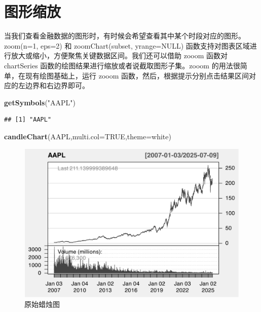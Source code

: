 \documentclass[]{ctexbook}
\newenvironment{Shaded}{\begin{snugshade}}{\end{snugshade}}
\newcommand{\AttributeTok}[1]{\textcolor[rgb]{0.13,0.29,0.53}{#1}}
\newcommand{\ConstantTok}[1]{\textcolor[rgb]{0.56,0.35,0.01}{#1}}
\newcommand{\FunctionTok}[1]{\textcolor[rgb]{0.13,0.29,0.53}{\textbf{#1}}}
\newcommand{\NormalTok}[1]{#1}
\newcommand{\StringTok}[1]{\textcolor[rgb]{0.31,0.60,0.02}{#1}}
\begin{document}
\section{图形缩放}\label{ux56feux5f62ux7f29ux653e}

当我们查看金融数据的图形时，有时候会希望查看其中某个时段对应的图形。zoom(n=1, eps=2) 和 zoomChart(subset, yrange=NULL) 函数支持对图表区域进行放大或缩小，方便聚焦关键数据区间。我们还可以借助 zooom 函数对 chartSeries 函数的绘图结果进行缩放或者说截取图形子集。zooom 的用法很简单，在现有绘图基础上，运行 zooom 函数，然后，根据提示分别点击结果区间对应的左边界和右边界即可。

\begin{Shaded}
\begin{Highlighting}[]
\FunctionTok{getSymbols}\NormalTok{(}\StringTok{"AAPL"}\NormalTok{)}
\end{Highlighting}
\end{Shaded}

\begin{verbatim}
## [1] "AAPL"
\end{verbatim}

\begin{Shaded}
\begin{Highlighting}[]
\FunctionTok{candleChart}\NormalTok{(AAPL,}\AttributeTok{multi.col=}\ConstantTok{TRUE}\NormalTok{,}\AttributeTok{theme=}\StringTok{\textquotesingle{}white\textquotesingle{}}\NormalTok{) }
\end{Highlighting}
\end{Shaded}

\begin{figure}
\includegraphics[width=0.9\linewidth]{quantmod_files/figure-latex/zoom-1} \caption{原始蜡烛图}\label{fig:zoom}
\end{figure}
\end{document}
